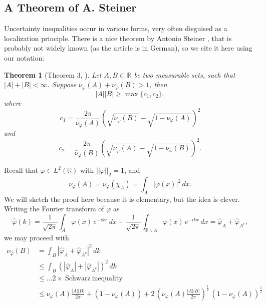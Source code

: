 \documentclass[12pt,a4paper]{article}
\newtheorem{theorem}{Theorem}
\begin{document}
\subsection{A Theorem of A. Steiner}
Uncertainty inequalities occur in various forms, very often disguised as a
localization principle. There is a nice theorem by Antonio Steiner \cite{Steiner1974},
that is probably not widely known (as the article is in German), so we cite it here
using our notation:
\begin{theorem}[Theorem 3, \cite{Steiner1974}]
Let $A,B\subset\mathbb{R}$ be two measurable sets, such that $|A|+|B|<\infty$. 
Suppose $\nu_{\varphi}(A) + \nu_{\hat\varphi}(B) > 1$, then
\begin{equation}
  |A| |B| \geq \max\{c_1,c_2\},
\end{equation}
where
\begin{displaymath}
    c_1= \frac{2\pi}{\nu_{\varphi}(A)}
   \left(\sqrt{ \nu_{\hat\varphi}(B)}-\sqrt{1-\nu_{\varphi}(A)}\right)^2  
\end{displaymath}
and
\begin{displaymath}
   c_2= \frac{2\pi}{\hat\nu_{\varphi}(B)}
   \left(\sqrt{ \nu_{\varphi}(A)}-\sqrt{1-\nu_{\hat\varphi}(B)}\right)^2. 
\end{displaymath}
\end{theorem}
Recall that $\varphi\in L^2(\mathbb{R})$ with $||\varphi||_2=1$, and
\begin{displaymath}
     \nu_{\varphi}(A)=\nu_{\varphi}(\chi_A)=\int_{A} |\varphi(x)|^2\,dx.
\end{displaymath}
We will sketch the proof here because it is elementary, but the idea is clever.
Writing the Fourier transform of $\varphi$ as
\begin{displaymath}
    \hat\varphi(k)=\frac{1}{\sqrt{2\pi}}\int_A \varphi(x)\,e^{-ikx}\, dx +
                   \frac{1}{\sqrt{2\pi}}\int_{\mathbb{R}\backslash A} 
                      \varphi(x)\,e^{-ikx}\, dx = \hat\varphi_A+\hat\varphi_{A^c},
\end{displaymath} 
we may proceed with
\begin{align*}
   \nu_{\hat\varphi}(B) & = \int_B |\hat\varphi_A+\hat\varphi_{A^c}|^2\, dk \\[5pt]
                        & \leq  \int_B (|\hat\varphi_A|+|\hat\varphi_{A^c}|)^2\, dk \\[5pt]
                        & \leq \ldots \mathrm{2\times\ Schwarz\ inequality} \\[5pt]
                        & \leq  \nu_{\varphi}(A)\frac{|A||B|}{2\pi} + (1-\nu_{\varphi}(A))
     + 2\,\left( \nu_{\varphi}(A)\frac{|A||B|}{2\pi}\right)^\frac{1}{2}\,
          \left(1-\nu_{\varphi}(A)\right)^\frac{1}{2}
\end{align*}
\end{document}

